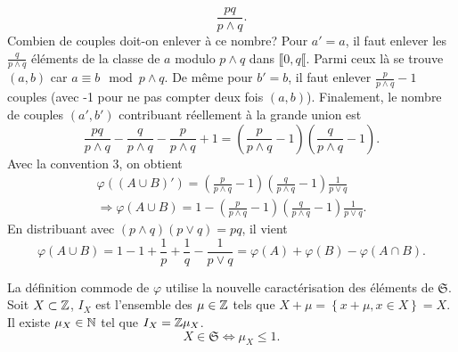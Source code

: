 \begin{enumerate}
\begin{displaymath}
  \frac{pq}{p \wedge q}.
\end{displaymath}
Combien de couples doit-on enlever à ce nombre?\newline
Pour $a' = a$, il faut enlever les $\frac{q}{p \wedge q}$ éléments de la classe de $a$ modulo $p \wedge q$ dans $\llbracket 0, q\llbracket$. Parmi ceux là se trouve $(a,b)$ car $a \equiv b \mod p\wedge q$. De même pour $b' = b$, il faut enlever $\frac{p}{p \wedge q}-1$ couples (avec -1 pour ne pas compter deux fois $(a,b)$).\newline
Finalement, le nombre de couples $(a',b')$ contribuant réellement à la grande union est 
\begin{displaymath}
  \frac{pq}{p \wedge q} - \frac{q}{p \wedge q} - \frac{p}{p \wedge q} + 1 = \left(\frac{p}{p \wedge q}-1\right) \left(\frac{q}{p \wedge q}-1\right).
\end{displaymath}
Avec la convention 3, on obtient
\begin{multline*}
  \varphi((A \cup B)') = \left(\frac{p}{p \wedge q}-1\right) \left(\frac{q}{p \wedge q}-1\right) \frac{1}{p \vee q}\\
  \Rightarrow
  \varphi(A \cup B) = 1 - \left(\frac{p}{p \wedge q}-1\right) \left(\frac{q}{p \wedge q}-1\right) \frac{1}{p \vee q}.
\end{multline*}
En distribuant avec $(p \wedge q)(p \vee q) = pq$, il vient
\begin{displaymath}
  \varphi(A \cup B) = 1 - 1 + \frac{1}{p} + \frac{1}{q} - \frac{1}{p \vee q} = \varphi(A) + \varphi(B) - \varphi(A\cap B).
\end{displaymath}
\end{enumerate}

La définition commode de $\varphi$ utilise la nouvelle caractérisation des éléments de $\mathfrak{S}$.\newline
Soit $X \subset \mathbb{Z}$, $I_X$ est l'ensemble des $\mu \in \mathbb{Z}$ tels que $X + \mu =\left\lbrace x + \mu , x\in X\right\rbrace = X$. Il existe $\mu_X \in \mathbb{N}$ tel que $I_X = \mathbb{Z} \mu_X$.
\begin{displaymath}
  X \in \mathfrak{S} \Leftrightarrow \mu_X \leq 1 .
\end{displaymath}


